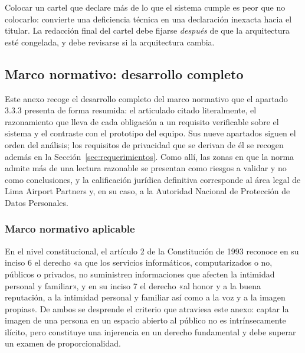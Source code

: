 Colocar un cartel que declare más de lo que el
sistema cumple es peor que no colocarlo: convierte una deficiencia
técnica en una declaración inexacta hacia el titular. La redacción final
del cartel debe fijarse \emph{después} de que la arquitectura esté
congelada, y debe revisarse si la arquitectura cambia.

\clearpage

\subsection{Marco normativo: desarrollo completo}
\label{anx:marco}

Este anexo recoge el desarrollo completo del marco normativo que el
apartado 3.3.3 presenta de forma resumida: el articulado citado
literalmente, el razonamiento que lleva de cada obligación a un
requisito verificable sobre el sistema y el contraste con el prototipo
del equipo. Sus nueve apartados siguen el orden del análisis; los
requisitos de privacidad que se derivan de él se recogen además en la Sección~\ref{sec:requerimientos}. Como allí, las zonas en que la norma admite más de una
lectura razonable se presentan como riesgos a validar y no como
conclusiones, y la calificación jurídica definitiva corresponde al área
legal de Lima Airport Partners y, en su caso, a la Autoridad Nacional de
Protección de Datos Personales.

\subsubsection{Marco normativo aplicable}

En el nivel constitucional, el artículo 2 de la Constitución de 1993
reconoce en su inciso 6 el derecho «a que los servicios informáticos,
computarizados o no, públicos o privados, no suministren informaciones
que afecten la intimidad personal y familiar», y en su inciso 7 el
derecho «al honor y a la buena reputación, a la intimidad personal y
familiar así como a la voz y a la imagen propias». De ambos se desprende
el criterio que atraviesa este anexo: captar la imagen de una persona en
un espacio abierto al público no es intrínsecamente ilícito, pero
constituye una injerencia en un derecho fundamental y debe superar un
examen de proporcionalidad.

